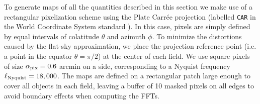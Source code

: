 \documentclass[a4paper,11pt]{article}
\begin{document}
    To generate maps of all the quantities described in this section we make use of a rectangular pixelization scheme using the Plate Carr\'ee projection (labelled {\tt CAR} in the World Coordinate System standard \cite{2002A&A...395.1077C}). In this case, pixels are simply defined by equal intervals of colatitude $\theta$ and azimuth $\phi$. To minimize the distortions caused by the flat-sky approximation, we place the projection reference point (i.e. a point in the equator $\theta=\pi/2$) at the center of each field. We use square pixels of size $\alpha_{\rm pix}=0.6$ arcmin on a side, corresponding to a Nyquist frequency $\ell_{\rm Nyquist}=18,000$. The maps are defined on a rectangular patch large enough to cover all objects in each field, leaving a buffer of 10 masked pixels on all edges to avoid boundary effects when computing the FFTs.
  
\end{document}
